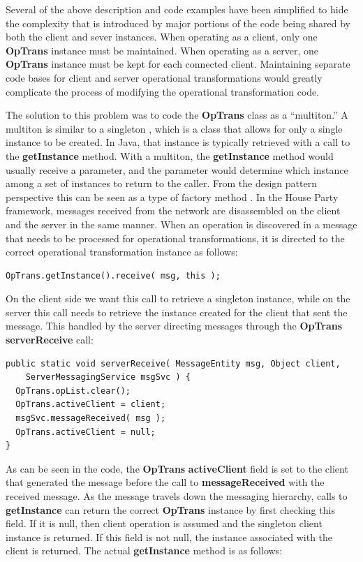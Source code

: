 \documentclass{article}
\begin{document}
Several of the above description and code examples have been
simplified to hide the complexity that is introduced by major portions
of the code being shared by both the client and sever instances.  When
operating as a client, only one \textbf{OpTrans} instance must be maintained.
When operating as a server, one \textbf{OpTrans} instance must be kept for each
connected client.  Maintaining separate code bases for client and
server operational transformations would greatly complicate the
process of modifying the operational transformation code.

The solution to this problem was to code the \textbf{OpTrans} class as a
``multiton.''  A multiton is similar to a singleton \cite{gof},
which is a class that allows for only a single instance to be created.
In Java, that instance is typically retrieved with a call to the
\textbf{getInstance} method.  With a multiton, the \textbf{getInstance}
method would
usually receive a parameter, and the parameter would determine which
instance among a set of instances to return to the caller.  From the
design pattern perspective this can be seen as a type of factory
method \cite{gof}.  In the House Party framework, messages
received from the network are disassembled on the client and the
server in the same manner.  When an operation is discovered in a
message that needs to be processed for operational transformations, it
is directed to the correct operational transformation instance as
follows:

\begin{verbatim}
OpTrans.getInstance().receive( msg, this );
\end{verbatim}

On the client side we want this call to retrieve a singleton instance,
while on the server this call needs to retrieve the instance created
for the client that sent the message.  This handled by the server
directing messages through the \textbf{OpTrans} \textbf{serverReceive} call:

\begin{verbatim}
public static void serverReceive( MessageEntity msg, Object client,
    ServerMessagingService msgSvc ) {
  OpTrans.opList.clear();
  OpTrans.activeClient = client;
  msgSvc.messageReceived( msg );
  OpTrans.activeClient = null;
}
\end{verbatim}

As can be seen in the code, the \textbf{OpTrans} \textbf{activeClient}
field is set to
the client that generated the message before the call to
\textbf{messageReceived} with the received message.  As the message travels
down the messaging hierarchy, calls to \textbf{getInstance} can return the
correct \textbf{OpTrans} instance by first checking this field.  If it is null,
then client operation is assumed and the singleton client instance is
returned.  If this field is not null, the instance associated with the
client is returned.  The actual \textbf{getInstance} method is as follows:
\end{document}
